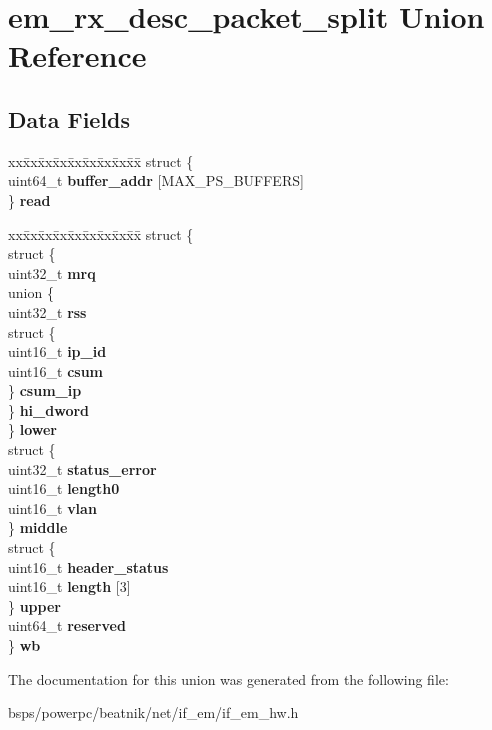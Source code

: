 \hypertarget{unionem__rx__desc__packet__split}{}\section{em\+\_\+rx\+\_\+desc\+\_\+packet\+\_\+split Union Reference}
\label{unionem__rx__desc__packet__split}
\subsection*{Data Fields}
\begin{DoxyCompactItemize}
\item 
\mbox{\label{unionem__rx__desc__packet__split_aa1064163045bfec4af608c4672d75920}} 
\begin{tabbing}
xx\=xx\=xx\=xx\=xx\=xx\=xx\=xx\=xx\=\kill
struct \{\\
\>uint64\_t {\bfseries buffer\_addr} \mbox{[}MAX\_PS\_BUFFERS\mbox{]}\\
\} {\bfseries read}\\

\end{tabbing}\item 
\mbox{\label{unionem__rx__desc__packet__split_a2eee48d67f725a3dc55987fe3017dc0a}} 
\begin{tabbing}
xx\=xx\=xx\=xx\=xx\=xx\=xx\=xx\=xx\=\kill
struct \{\\
\>struct \{\\
\>\>uint32\_t {\bfseries mrq}\\
\>\>union \{\\
\>\>\>uint32\_t {\bfseries rss}\\
\>\>\>struct \{\\
\>\>\>\>uint16\_t {\bfseries ip\_id}\\
\>\>\>\>uint16\_t {\bfseries csum}\\
\>\>\>\} {\bfseries csum\_ip}\\
\>\>\} {\bfseries hi\_dword}\\
\>\} {\bfseries lower}\\
\>struct \{\\
\>\>uint32\_t {\bfseries status\_error}\\
\>\>uint16\_t {\bfseries length0}\\
\>\>uint16\_t {\bfseries vlan}\\
\>\} {\bfseries middle}\\
\>struct \{\\
\>\>uint16\_t {\bfseries header\_status}\\
\>\>uint16\_t {\bfseries length} \mbox{[}3\mbox{]}\\
\>\} {\bfseries upper}\\
\>uint64\_t {\bfseries reserved}\\
\} {\bfseries wb}\\

\end{tabbing}\end{DoxyCompactItemize}


The documentation for this union was generated from the following file\+:\begin{DoxyCompactItemize}
\item 
bsps/powerpc/beatnik/net/if\+\_\+em/if\+\_\+em\+\_\+hw.\+h\end{DoxyCompactItemize}
